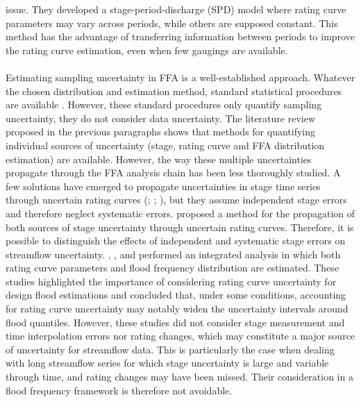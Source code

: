 \documentclass[11pt]{article}
\begin{document}
issue. They developed a stage-period-discharge (SPD) model where rating curve parameters may vary across periods, while others are supposed constant. This method has the advantage of transferring information between periods to improve the rating curve estimation, even when few gaugings are available.
    
    \paragraph{}
    Estimating sampling uncertainty in FFA is a well-established approach. Whatever the chosen distribution and estimation method, standard statistical procedures are available \citep{coles_classical_2001}. However, these standard procedures only quantify sampling uncertainty, they do not consider data uncertainty. The literature review proposed in the previous paragraphs shows that methods for quantifying individual sources of uncertainty (stage, rating curve and FFA distribution estimation) are available. However, the way these multiple uncertainties propagate through the FFA analysis chain has been less thoroughly studied. A few solutions have emerged to propagate uncertainties in stage time series through uncertain rating curves (\citet{dymond_accuracy_1982}; \citet{herschy_hydrometry_1998}; \citet{petersen-overleir_uncertainty_2005}), but they assume independent stage errors and therefore neglect systematic errors. \citet{horner_impact_2018} proposed a method for the propagation of both sources of stage uncertainty through uncertain rating curves. Therefore, it is possible to distinguish the effects of independent and systematic stage errors on streamflow uncertainty. \citet{petersen-overleir_accounting_2009}, \citet{steinbakk_propagation_2016}, and \citet{vieira_assessing_2022} performed an integrated analysis in which both rating curve parameters and flood frequency distribution are estimated. These studies highlighted the importance of considering rating curve uncertainty for design flood estimations and concluded that, under some conditions, accounting for rating curve uncertainty may notably widen the uncertainty intervals around flood quantiles. However, these studies did not consider stage measurement and time interpolation errors nor rating changes, which may constitute a major source of uncertainty for streamflow data. This is particularly the case when dealing with long streamflow series for which stage uncertainty is large and variable through time, and rating changes may have been missed. Their consideration in a flood frequency framework is therefore not avoidable. 
        
\end{document}
